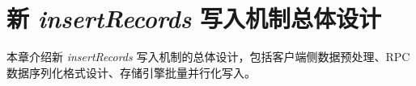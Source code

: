 
\chapter{新 \emph{insertRecords} 写入机制总体设计}
本章介绍新 \emph{insertRecords} 写入机制的总体设计，包括客户端侧数据预处理、RPC 数据序列化格式设计、存储引擎批量并行化写入。

